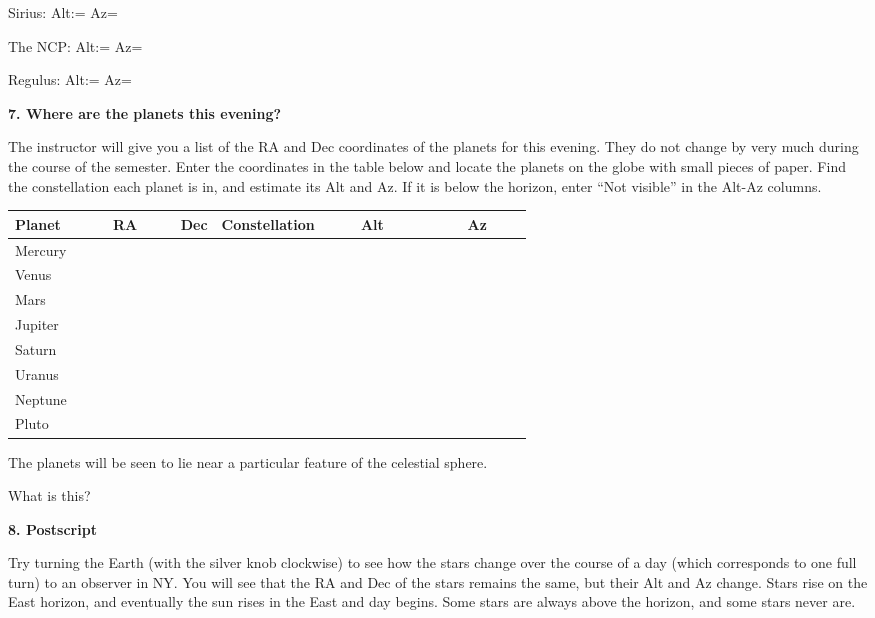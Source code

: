 \documentclass[12pt]{article}
\begin{document}
\medskip   
Sirius: Alt:= \makebox[4cm]{\hrulefill} Az= \makebox[4cm]{\hrulefill}

The NCP:  Alt:= \makebox[4cm]{\hrulefill} Az= \makebox[4cm]{\hrulefill}

Regulus: Alt:= \makebox[4cm]{\hrulefill} Az= \makebox[4cm]{\hrulefill}

\bigskip

\newpage
\noindent
{\bf 7. Where are the planets this evening?}

\bigskip
\noindent
The instructor will give you a list of the RA and Dec coordinates of the planets
for this evening. They do not change by very much during the course of
the semester. Enter the coordinates in the  table below and  locate the
planets on the globe with small pieces of paper. Find the
constellation each planet is in, and estimate its Alt and Az. If it is
below the horizon, enter ``Not visible'' in the Alt-Az columns.

\medskip
\begin{center}
\begin{tabular}{lccccc} \hline
Planet  & \ \ \ \ RA  \ \ \ & \hspace{1.5cm} Dec \hspace{1.5cm} &
         Constellation &\ \ \ \  Alt \ \ \ \ & \ \ \ \  Az\ \ \  \ \\ 
         \hline
Mercury   &  &   & & &       \\ \hline
Venus   &  &   &     & &    \\ \hline
Mars &  &   &     & &    \\ \hline
Jupiter  &  &   &   & &      \\ \hline
Saturn  &  &   &   & &      \\  \hline
Uranus &  &   &    & &   \\  \hline 
Neptune  &  &   &   & &    \\  \hline 
Pluto  &  &   &   & &    \\  \hline 
\end{tabular}
\end{center}

The planets will be seen to lie near a particular feature of the
celestial sphere. 

What is this? \makebox[4cm]{\hrulefill}

\bigskip
\bigskip
\noindent 
{\bf 8. Postscript}

\bigskip\noindent
Try turning the Earth (with the silver knob clockwise) to see how the
stars change over the course of a day (which corresponds to one full
turn) to an observer in NY.  You will see that the RA and Dec of the
stars remains the same, but their Alt and Az change. Stars rise on the
East horizon, and eventually the sun rises in the East and day
begins. Some stars are always above the horizon, and some stars never
are.
\end{document}

